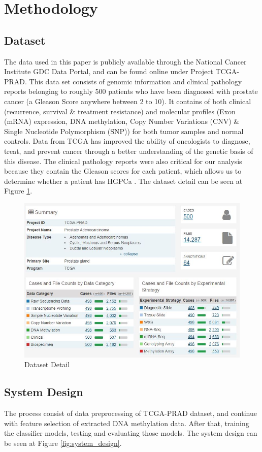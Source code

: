 \documentclass[a4paper,oneside]{article}
\begin{document}
\section{Methodology}
\subsection{Dataset}
The data used in this paper is publicly available through the National Cancer Institute GDC Data Portal, and can be found online under Project TCGA-PRAD. This data set consists of genomic information and clinical pathology reports belonging to roughly 500 patients who have been diagnosed with prostate cancer (a Gleason Score anywhere between 2 to 10). It contains of both clinical (recurrence, survival \& treatment resistance) and molecular profiles (Exon (mRNA) expression, DNA methylation, Copy Number Variations (CNV) \& Single Nucleotide Polymorphism (SNP)) for both tumor samples and normal controls. Data from TCGA has improved the ability of oncologists to diagnose, treat, and prevent cancer through a better understanding of the genetic basis of this disease. The clinical pathology reports were also critical for our analysis because they contain the Gleason scores for each patient, which allows us to determine whether a patient has HGPCa \cite{two}. The dataset detail can be seen at Figure \ref{fig:dataset_detail}.

\begin{figure}
  \includegraphics[width=0.7\linewidth]{dataset_detail}
  \centering
  \caption{Dataset Detail}
  \label{fig:dataset_detail}
\end{figure}

\subsection{System Design}
The process consist of data preprocessing of TCGA-PRAD dataset, and continue with feature selection of extracted DNA methylation data. After that, training the classifier models, testing and evaluating those models. The system design can be seen at Figure \ref{fig:system_design}.
\end{document}
